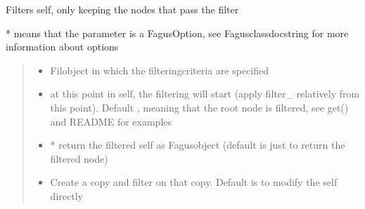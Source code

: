 \documentclass[a4paper,10pt,english]{sphinxmanual}
\begin{document}
\begin{fulllineitems}
\begin{fulllineitems}
\label{\detokenize{fagus:fagus.Fagus.filter}}
\pysigstartsignatures
{}
\pysigstopsignatures
\sphinxAtStartPar
Filters self, only keeping the nodes that pass the filter

\sphinxAtStartPar
* means that the parameter is a FagusOption, see Fagus\sphinxhyphen{}class\sphinxhyphen{}docstring for more information about options
\begin{quote}\begin{description}
\begin{itemize}
\item {}
\sphinxAtStartPar
{} \textendash{} Fil\sphinxhyphen{}object in which the filtering\sphinxhyphen{}criteria are specified

\item {}
\sphinxAtStartPar
{} \textendash{} at this point in self, the filtering will start (apply filter\_ relatively from this point).
Default , meaning that the root node is filtered, see get() and README for examples

\item {}
\sphinxAtStartPar
{} \textendash{} * return the filtered self as Fagus\sphinxhyphen{}object (default is just to return the filtered node)

\item {}
\sphinxAtStartPar
{} \textendash{} Create a copy and filter on that copy. Default is to modify the self directly


\end{itemize}
\end{description}
\end{quote}
\end{fulllineitems}
\end{fulllineitems}
\end{document}
